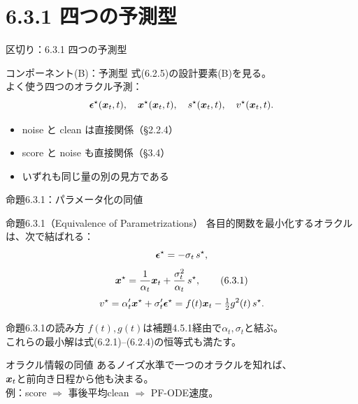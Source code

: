 \section{6.3.1 四つの予測型}
\asmain
\begin{frame}{区切り：6.3.1 四つの予測型}
    \tableofcontents[currentsection]
\end{frame}
\asmain
\begin{frame}{コンポーネント(B)：予測型}
    式(6.2.5)の設計要素(B)を見る。\\
    よく使う四つのオラクル予測：
    \[
        \bm{\epsilon}^\star(\bm{x}_t,t),\quad
        \bm{x}^\star(\bm{x}_t,t),\quad
        s^\star(\bm{x}_t,t),\quad
        v^\star(\bm{x}_t,t).
    \]
    \begin{itemize}
        \item noise と clean は直接関係（§2.2.4）
        \item score と noise も直接関係（§3.4）
        \item いずれも同じ量の別の見方である
    \end{itemize}
\end{frame}
\asmain
\begin{frame}{命題6.3.1：パラメータ化の同値}
    \begin{block}{命題6.3.1（Equivalence of Parametrizations）}
        各目的関数を最小化するオラクルは、次で結ばれる：
        \[
            \bm{\epsilon}^\star = -\sigma_t\, s^\star,
        \]
        \[
            \bm{x}^\star
            =
            \frac{1}{\alpha_t}\bm{x}_t
            +
            \frac{\sigma_t^{2}}{\alpha_t}\, s^\star,
            \tag{6.3.1}
        \]
        \[
            v^\star
            =
            \alpha_t'\bm{x}^\star + \sigma_t'\bm{\epsilon}^\star
            =
            f(t)\bm{x}_t - \tfrac12 g^{2}(t)\, s^\star.
        \]
    \end{block}
\end{frame}
\asmain
\begin{frame}{命題6.3.1の読み方}
    $f(t),g(t)$は補題4.5.1経由で$\alpha_t,\sigma_t$と結ぶ。\\
    これらの最小解は式(6.2.1)--(6.2.4)の恒等式も満たす。
    \begin{exampleblock}{オラクル情報の同値}
        あるノイズ水準で一つのオラクルを知れば、\\
        $\bm{x}_t$と前向き日程から他も決まる。\\
        例：score $\Rightarrow$ 事後平均clean $\Rightarrow$ PF-ODE速度。
    \end{exampleblock}
\end{frame}

